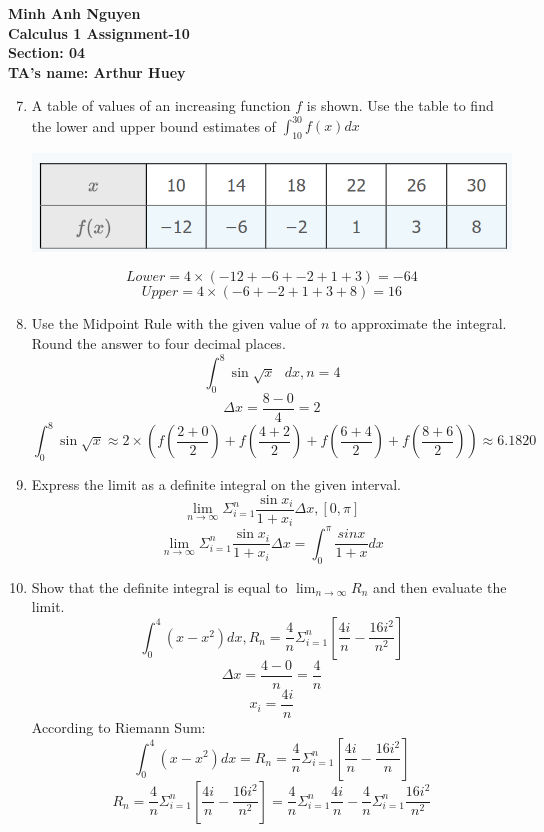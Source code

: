 \documentclass[12pt]{article}
\begin{document}
\textbf{Minh Anh Nguyen }\\
\textbf{Calculus 1 Assignment-10}\\
\textbf{Section: 04}\\
\textbf{TA's name: Arthur Huey}

\hrulefill

\begin{enumerate}
\setcounter{enumi}{6}
    \item A table of values of an increasing function $f$ is shown. Use the table to find the lower and upper bound estimates of $\int_{10}^{30} f(x)dx$
    \begin{center}
        \includegraphics[scale=0.5]{img/img-0.png}
    \end{center}
    \[Lower = 4\times(-12 + -6 + -2 + 1 + 3) = -64\]
    \[Upper = 4\times(-6 + -2 + 1 + 3 + 8) = 16\]
\setcounter{enumi}{10}
    \item Use the Midpoint Rule with the given value of $n$ to approximate the integral. Round the answer to four decimal places.
    \[\int_{0}^{8} \sin \sqrt{x} \text{ } dx, n = 4\]
    \[\Delta x = \frac{8-0}{4} = 2\]
    \[\int_{0}^{8} \sin \sqrt{x} \approx 2 \times (f(\frac{2+0}{2}) + f(\frac{4+2}{2}) + f(\frac{6+4}{2}) + f(\frac{8+6}{2})) \approx 6.1820\]
\setcounter{enumi}{18}
    \item Express the limit as a definite integral on the given interval.
    \[\lim_{n \to \infty} \Sigma_{i=1}^{n} \frac{\sin x_i}{1 + x_i}\Delta x, [0,\pi]\]
    \[\lim_{n \to \infty} \Sigma_{i=1}^{n} \frac{\sin x_i}{1 + x_i}\Delta x = \int_{0}^{\pi} \frac{sin x}{1 + x} dx\]
\setcounter{enumi}{22} 
    \item Show that the definite integral is equal to $\lim_{n \to \infty} R_n$ and then evaluate the limit.
    \[\int_{0}^{4}(x-x^2)dx, R_n = \frac{4}{n} \Sigma_{i = 1}^{n}[\frac{4i}{n} - \frac{16i^2}{n^2}]\]
    \[\Delta x = \frac{4-0}{n} = \frac{4}{n}\]
    \[x_i = \frac{4i}{n}\]
    According to Riemann Sum:
    \[\int_{0}^{4}(x-x^2)dx = R_n = \frac{4}{n} \Sigma_{i = 1}^{n}[\frac{4i}{n} - \frac{16i^2}{n}]\]
    \[R_n = \frac{4}{n} \Sigma_{i = 1}^{n}[\frac{4i}{n} - \frac{16i^2}{n^2}] = \frac{4}{n} \Sigma_{i = 1}^{n}\frac{4i}{n} - \frac{4}{n} \Sigma_{i = 1}^{n} \frac{16i^2}{n^2}\]

\end{enumerate}
\end{document}
